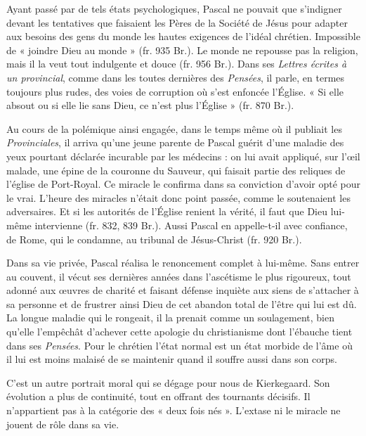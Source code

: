 \documentclass[12pt,a4paper]{article}
\begin{document}
Ayant passé par de tels états psychologiques, Pascal ne pouvait
que s'indigner devant les tentatives que faisaient les Pères de la
Société de Jésus pour adapter aux besoins des gens du monde les
hautes exigences de l'idéal chrétien. Impossible de « joindre Dieu
au monde » (fr. 935 Br.). Le monde ne repousse pas la religion,
mais il la veut tout indulgente et douce (fr. 956 Br.). Dans ses
\emph{Lettres écrites à un provincial}, comme dans les toutes dernières
des \emph{Pensées}, il parle, en termes toujours plus rudes, des voies de
corruption où s'est enfoncée l'Église. « Si elle absout ou si elle lie
sans Dieu, ce n'est plus l'Église » (fr. 870 Br.).

Au cours de la polémique ainsi engagée, dans le temps même où
il publiait les \emph{Provinciales}, il arriva qu'une jeune parente de Pascal
guérit d'une maladie des yeux pourtant déclarée incurable par les
médecins : on lui avait appliqué, sur l'œil malade, une épine de la
couronne du Sauveur, qui faisait partie des reliques de l'église de
Port-Royal. Ce miracle le confirma dans sa conviction d'avoir opté
pour le vrai. L'heure des miracles n'était donc point passée, comme
le soutenaient les adversaires. Et si les autorités de l'Église renient
la vérité, il faut que Dieu lui-même intervienne (fr. 832, 839 Br.).
Aussi Pascal en appelle-t-il avec confiance, de Rome, qui le condamne,
au tribunal de Jésus-Christ (fr. 920 Br.).

Dans sa vie privée, Pascal réalisa le renoncement complet à lui-même.
Sans entrer au couvent, il vécut ses dernières années dans
l'ascétisme le plus rigoureux, tout adonné aux œuvres de charité
et faisant défense inquiète aux siens de s'attacher à sa personne et
de frustrer ainsi Dieu de cet abandon total de l'être qui lui est dû.
La longue maladie qui le rongeait, il la prenait comme un soulagement,
bien qu'elle l'empêchât d'achever cette apologie du christianisme
dont l'ébauche tient dans ses \emph{Pensées}. Pour le chrétien
l'état normal est un état morbide de l'âme où il lui est moins
malaisé de se maintenir quand il souffre aussi dans son corps.

\bigskip

C'est un autre portrait moral qui se dégage pour nous de Kierkegaard.
Son évolution a plus de continuité, tout en offrant des
tournants décisifs. Il n'appartient pas à la catégorie des « deux
fois nés ». L'extase ni le miracle ne jouent de rôle dans sa vie.
\end{document}
